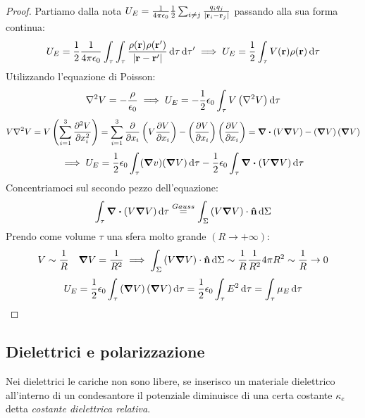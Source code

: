 \documentclass[12pt,a4paper]{article}
\begin{document}
\begin{proof}
    Partiamo dalla nota $U_{E}= \frac{1}{4\pi\epsilon_0}\frac{1}{2}\sum_{i\neq j}\frac{q_iq_j}{\abs{\vb{r}_i-\vb{r}_j}} $ passando alla sua forma continua:
    \begin{equation*}
        U_E= \frac{1}{2}\frac{1}{4\pi\epsilon_0}\int_\tau\int_\tau\frac{\rho(\vb{r})\rho(\vb{r}')}{\abs{\vb{r}-\vb{r}'}}\dd{\tau}\dd{\tau'}\implies
        U_E= \frac{1}{2}\int_\tau V(\vb{r})\rho(\vb{r}) \dd{\tau}
    \end{equation*}
    Utilizzando l'equazione di Poisson:
    \begin{equation*}
        \laplacian V = -\frac{\rho}{\epsilon_0}\implies U_E = -\frac{1}{2}\epsilon_0\int_\tau V \left( \laplacian{V} \right)\dd{\tau}
    \end{equation*}
    \begin{equation*}
        V \laplacian{V}= V \left(\sum_{i=1}^{3} \pdv[2]{V}{x_i}\right)= \sum_{i=1}^{3}\pdv{}{x_i}\left( V \pdv{V}{x_i} \right)- \left( \pdv{V}{x_i} \right)\left( \pdv{V}{x_i} \right)
        = \div \left( V \grad{V} \right)- \left( \grad{V} \right)\left( \grad{V} \right) 
    \end{equation*}
    \begin{equation*}
       \implies U_E = \frac{1}{2} \epsilon_0\int_\tau(\grad{v})(\grad{V}) \dd{\tau}-\frac{1}{2}\epsilon_0\int_\tau\div(V\grad{V})\dd{\tau}
    \end{equation*}
    Concentriamoci sul secondo pezzo dell'equazione:
    \begin{equation*}
        \int_\tau\div(V\grad{V})\dd{\tau} \overset{Gauss}{=} \int_\Sigma\left( V\grad{V} \right)\cdot\vu{n}\dd{\Sigma}
    \end{equation*}
    Prendo come volume $\tau$ una sfera molto grande $(R\rightarrow+\infty)$:
    \begin{equation*}
        V \sim \frac{1}{R}  \quad\grad{V}= \frac{1}{R^2}\implies \int_\Sigma \left( V\grad{V} \right)\cdot\vu{n}\dd{\Sigma}
        \sim \frac{1}{R}\frac{1}{R^2}4\pi R^2 \sim \frac{1}{R}\rightarrow 0 
    \end{equation*}
    \begin{equation*}
        U_E = \frac{1}{2}\epsilon_0\int_{\tau}\left( \grad{V} \right)\left( \grad{V} \right)\dd{\tau}= \frac{1}{2}\epsilon_0\int_{\tau}
        E^2 \dd{\tau}= \int_\tau  \mu_E \dd{\tau}
    \end{equation*}
\end{proof}

\subsection{Dielettrici e polarizzazione}
Nei dielettrici le cariche non sono libere, se inserisco un materiale dielettrico all'interno di un condesantore 
il potenziale diminuisce di una certa costante $\kappa_e$ detta \textit{costante dielettrica relativa}.
\end{document}
